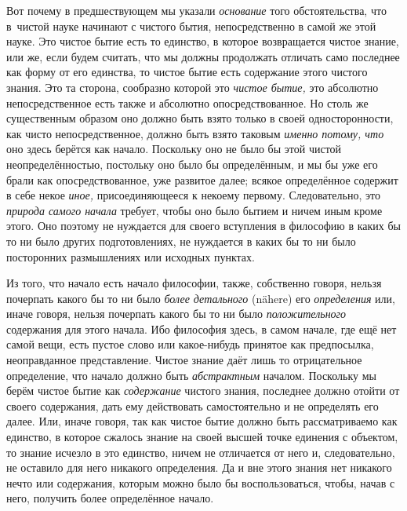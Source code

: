 Вот почему в предшествующем мы указали {\em основание} того обстоятельства, что
в~чистой науке начинают с чистого бытия, непосредственно в самой же этой науке.
Это чистое бытие есть то единство, в которое возвращается чистое знание, или
же, если будем считать, что мы должны продолжать отличать само последнее как
форму от его единства, то чистое бытие есть содержание этого чистого знания.
Это та сторона, сообразно которой это {\em чистое бытие,} это абсолютно
непосредственное есть также и абсолютно опосредствованное. Но столь же
существенным образом оно должно быть взято только в своей односторонности, как
чисто непосредственное, должно быть взято таковым {\em именно потому, что} оно
здесь берётся как начало. Поскольку оно не было бы этой чистой
неопределённостью, постольку оно было бы определённым, и мы бы уже его брали
как опосредствованное, уже развитое далее; всякое определённое содержит в себе
некое {\em иное,} присоединяющееся к некоему первому. Следовательно, это
{\em природа самого начала} требует, чтобы оно было бытием и ничем иным кроме
этого. Оно поэтому не нуждается для своего вступления в философию в каких бы то
ни было других подготовлениях, не нуждается в каких бы то ни было посторонних
размышлениях или исходных пунктах.

Из того, что начало есть начало философии, также, собственно говоря, нельзя
почерпать какого бы то ни было {\em более детального} (nähere) его
{\em определения} или, иначе говоря, нельзя почерпать какого бы то ни было
{\em положительного} содержания для этого начала. Ибо философия здесь, в самом
начале, где ещё нет самой вещи, есть пустое слово или какое-нибудь принятое как
предпосылка, неоправданное представление. Чистое знание даёт лишь то
отрицательное определение, что начало должно быть {\em абстрактным} началом.
Поскольку мы берём чистое бытие как {\em содержание} чистого знания, последнее
должно отойти от своего содержания, дать ему действовать самостоятельно и не
определять его далее. Или, иначе говоря, так как чистое бытие должно быть
рассматриваемо как единство, в которое сжалось знание на своей высшей точке
единения с объектом, то знание исчезло в это единство, ничем не отличается от
него и, следовательно, не оставило для него никакого определения. Да и вне
этого знания нет никакого нечто или содержания, которым можно было бы
воспользоваться, чтобы, начав с него, получить более определённое начало.

